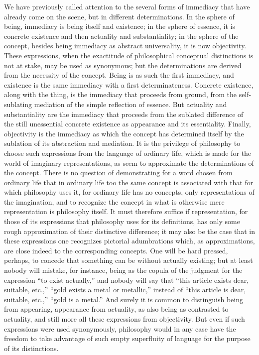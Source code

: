 We have previously called attention to
the several forms of immediacy
that have already come on the scene,
but in different determinations.
In the sphere of being, immediacy is
being itself and existence;
in the sphere of essence,
it is concrete existence
and then actuality and substantiality;
in the sphere of the concept,
besides being immediacy as abstract universality,
it is now objectivity.
These expressions, when the exactitude
of philosophical conceptual distinctions is
not at stake, may be used as synonymous;
but the determinations are derived
from the necessity of the concept.
Being is as such the first immediacy,
and existence is the same immediacy
with a first determinateness.
Concrete existence, along with the thing,
is the immediacy that proceeds from ground,
from the self-sublating mediation
of the simple reflection of essence.
But actuality and substantiality are
the immediacy that proceeds from
the sublated difference of the still unessential
concrete existence as appearance and its essentiality.
Finally, objectivity is the immediacy
as which the concept has determined itself
by the sublation of its abstraction and mediation.
It is the privilege of philosophy to choose
such expressions from the language of ordinary life,
which is made for the world of imaginary representations,
as seem to approximate the determinations of the concept.
There is no question of demonstrating
for a word chosen from ordinary life
that in ordinary life too the same concept is associated
with that for which philosophy uses it,
for ordinary life has no concepts,
only representations of the imagination,
and to recognize the concept in what is otherwise
mere representation is philosophy itself.
It must therefore suffice if representation,
for those of its expressions
that philosophy uses for its definitions,
has only some rough approximation
of their distinctive difference;
it may also be the case that in these expressions
one recognizes pictorial adumbrations
which, as approximations, are close indeed to the
corresponding concepts.
One will be hard pressed, perhaps,
to concede that something can be
without actually existing;
but at least nobody will mistake, for instance,
being as the copula of the judgment
for the expression “to exist actually,”
and nobody will say that
“this article exists dear, suitable, etc.,”
“gold exists a metal or metallic,”
instead of “this article is dear, suitable, etc.,”
“gold is a metal.”
And surely it is common to distinguish
being from appearing,
appearance from actuality,
as also being as contrasted to actuality,
and still more all these expressions from objectivity.
But even if such expressions were used synonymously,
philosophy would in any case have the freedom
to take advantage of such empty superfluity of language
for the purpose of its distinctions.

